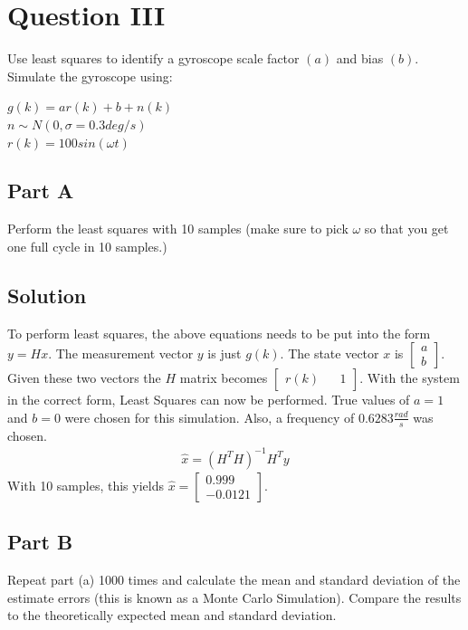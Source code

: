 \documentclass{article}
\begin{document}
\section*{Question III}
Use least squares to identify a gyroscope scale factor $(a)$ and bias $(b)$.  Simulate the gyroscope using:
\begin{center}
    $g(k) = ar(k) + b + n(k)$\\
    $n\sim N(0, \sigma = 0.3 deg/s)$\\
    $r(k) = 100sin(\omega t)$
\end{center}
\subsection*{Part A}
Perform the least squares with 10 samples (make sure to pick $\omega$ so that you get one full cycle in 10 samples.)
\subsection*{Solution}
To perform least squares, the above equations needs to be put into the form $y = Hx$.  The measurement vector $y$ is just $g(k)$.  The state 
vector $x$ is $\begin{bmatrix} a \\ b \end{bmatrix}$.  Given these two vectors the $H$ matrix becomes $\begin{bmatrix} r(k) && 1 \end{bmatrix}$.
With the system in the correct form, Least Squares can now be performed.  True values of $a = 1$ and $b=0$ were chosen for this simulation.
Also, a frequency of $0.6283 \frac{rad}{s}$ was chosen.
\begin{gather*}
    \hat{x} = (H^T H)^{-1}H^T y
\end{gather*}
With 10 samples, this yields $\hat{x} = \begin{bmatrix} 0.999 \\ -0.0121 \end{bmatrix}$.

\subsection*{Part B}
Repeat part (a) 1000 times and calculate the mean and standard deviation of the estimate errors (this is known as a Monte Carlo Simulation).  
Compare the results to the theoretically expected mean and standard deviation.
\end{document}
